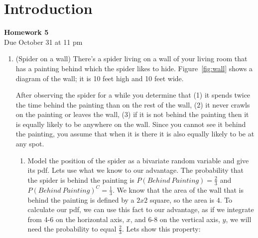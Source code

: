 \documentclass[12pt,twoside]{article}
\begin{document}
\section{Introduction}
\begin{center}
{\large{\textbf{Homework 5}} } \vspace{0.2cm}\\
Due October 31 at 11 pm
\\
\end{center}

\begin{enumerate}

\item (Spider on a wall) There's a spider living on a wall of your living room that has a painting behind which the spider likes to hide. Figure~\ref{fig:wall} shows a diagram of the wall; it is 10 feet high and 10 feet wide.

After observing the spider for a while you determine that (1) it spends twice the time behind the painting than on the rest of the wall, (2) it never crawls on the painting or leaves the wall, (3) if it is not behind the painting then it is equally likely to be anywhere on the wall. Since you cannot see it behind the painting, you assume that when it is there it is also equally likely to be at any spot.

\begin{enumerate}
\item Model the position of the spider as a bivariate random variable and give its pdf.
\subitem
Lets use what we know to our advantage. The probability that the spider is behind the painting is $P(Behind \ Painting)=\frac{2}{3}$ and $P(Behind \ Painting)^C=\frac{1}{3}$. We know that the area of the wall that is behind the painting is defined by a $2x2$ square, so the area is $4$. To calculate our pdf, we can use this fact to our advantage, as if we integrate from 4-6 on the horizontal axis, $x$, and 6-8 on the vertical axis, $y$, we will need the probability to equal $\frac{2}{3}$. Lets show this property:


\end{enumerate}
\end{enumerate}
\end{document}
